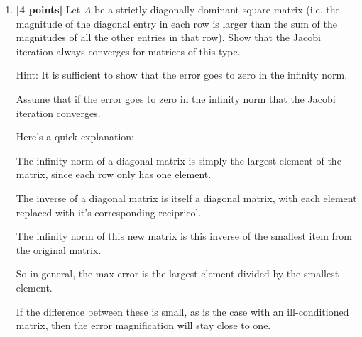 \documentclass{article}
\begin{document}
\begin{enumerate}
\begin{enumerate}
\begin{mdframed}[style=MyFrame]
\begin{equation*}
\Vert A \Vert_{1} = |-9| + |0| + |0| + |-5| = 14
\end{equation*}
\begin{equation*}
\Vert A^{-1} \Vert_{1} = |225| + |45| + |9| + |1| = 1279.25
\end{equation*}
\begin{equation*}
\displaystyle \kappa_{1} (A) = 14*1279.25 = 17909.5
\end{equation*}

Using the same error values calculated before. Yes, the actual error is within this boundary as well (it is larger than the previous upper bound so the same conclusion applies).

\end{mdframed}

\end{enumerate}

{\bf Note}: You can use the file {\tt a3q1.m} to ensure that you are working with the correct $A$ and $b$ values.

\medskip

\item {\bf [4 points]} Let $A$ be a strictly diagonally dominant square matrix (i.e. the magnitude of the diagonal entry in each row is larger than the sum of the magnitudes of all the other entries in that row). Show that the Jacobi iteration always converges for matrices of this type.

Hint: It is sufficient to show that the error goes to zero in the infinity norm. \newline

\begin{mdframed}[style=MyFrame]
  Assume that if the error goes to zero in the infinity norm that the Jacobi iteration converges.

Here's a quick explanation:

The infinity norm of a diagonal matrix is simply the largest element of the matrix, since each row only has one element.

The inverse of a diagonal matrix is itself a diagonal matrix, with each element replaced with it's corresponding recipricol.

The infinity norm of this new matrix is this inverse of the smallest item from the original matrix.

So in general, the max error is the largest element divided by the smallest element.

If the difference between these is small, as is the case with an ill-conditioned matrix, then the error magnification will stay close to one.


\end{mdframed}
\end{enumerate}
\end{document}
